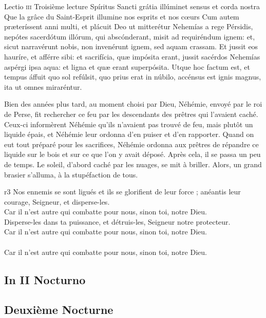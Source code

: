 \documentclass[twoside]{article}
\begin{document}
\begin{paracol}[1]{2}
\lectioresponsorium
	{Lectio \textsc{iii}}
	{Troisième lecture}
	{Spíritus Sancti grátia illúminet sensus et corda nostra}
	{Que la grâce du Saint-Esprit illumine nos esprits et nos cœurs}
	{
		Cum autem præteríssent anni multi, et plácuit Deo ut mitterétur Nehemías a rege Pérsidis, 
		nepótes sacerdótum illórum, qui abscónderant, misit ad requiréndum ignem: et, sicut narravérunt nobis, non invenérunt ignem, sed aquam crassam.
		Et jussit eos hauríre, et afférre sibi: et sacrifícia, quæ impósita erant, jussit sacérdos Nehemías aspérgi ipsa aqua: et ligna et quæ erant superpósita.
		Utque hoc factum est, et tempus áffuit quo sol refúlsit, quo prius erat in núbilo, accénsus est ignis magnus, ita ut omnes miraréntur.
	}
	{	
	
		Bien des années plus tard, au moment choisi par Dieu, Néhémie, envoyé par le roi de Perse, fit rechercher ce feu par les descendants des prêtres qui l’avaient caché. 
		Ceux-ci informèrent Néhémie qu’ils n’avaient pas trouvé de feu, mais plutôt un liquide épais, et Néhémie leur ordonna d’en puiser et d’en rapporter.
		Quand on eut tout préparé pour les sacrifices, Néhémie ordonna aux prêtres de répandre ce liquide sur le bois et sur ce que l’on y avait déposé.
		Après cela, il se passa un peu de temps. Le soleil, d’abord caché par les nuages, se mit à briller. Alors, un grand brasier s’alluma, à la stupéfaction de tous.
	}
	{r3}
	{\vfill
	\rr Nos ennemis se sont ligués et ils se glorifient de leur force ; anéantis leur courage, Seigneur, et disperse-les.\\
	\GreSpecial{*} Car il n'est autre qui combatte pour nous, sinon toi, notre Dieu.\\
	\vv Disperse-les dans ta puissance, et détruis-les, Seigneur notre protecteur.\\
	\GreSpecial{*} Car il n'est autre qui combatte pour nous, sinon toi, notre Dieu.\\
	\versetGloireAuPere{}\\
	\GreSpecial{*} Car il n'est autre qui combatte pour nous, sinon toi, notre Dieu.}

\subsection{In II Nocturno}

\switchcolumn

\subsection{Deuxième Nocturne}


\end{paracol}
\end{document}
